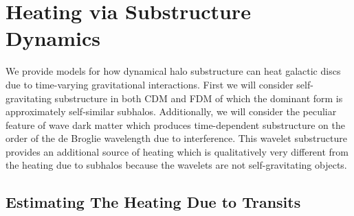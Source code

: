 \documentclass[usenatbib]{mnras}
\begin{document}
\section{Heating via Substructure Dynamics}

We provide models for how dynamical halo substructure can heat galactic discs due to time-varying gravitational interactions. First we will consider self-gravitating substructure in both CDM and FDM of which the dominant form is approximately self-similar subhalos. Additionally, we will consider the peculiar feature of wave dark matter which produces time-dependent substructure on the order of the de Broglie wavelength due to interference. This wavelet substructure provides an additional source of heating which is qualitatively very different from the heating due to subhalos because the wavelets are not self-gravitating objects. 

\subsection{Estimating The Heating Due to Transits}
\end{document}
